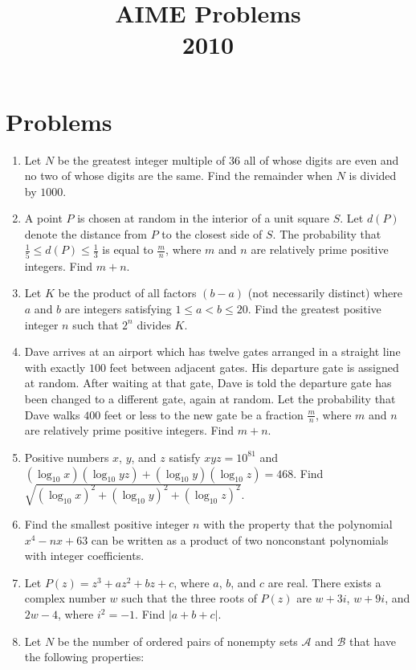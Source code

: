 \documentclass{article}
\title{AIME Problems \\ 2010}
\date{}
\begin{document}
\maketitle\thispagestyle{fancy}\newpage\section*{Problems}\begin{enumerate}[label=\arabic*., itemsep=0.5em]\item Let $N$ be the greatest integer multiple of $36$ all of whose digits are even and no two of whose digits are the same. Find the remainder when $N$ is divided by $1000$.\par \vspace{0.5em}\item A point $P$ is chosen at random in the interior of a unit square $S$. Let $d(P)$ denote the distance from $P$ to the closest side of $S$. The probability that $\frac{1}{5}\le d(P)\le\frac{1}{3}$ is equal to $\frac{m}{n}$, where $m$ and $n$ are relatively prime positive integers. Find $m+n$.\par \vspace{0.5em}\item Let $K$ be the product of all factors $(b-a)$ (not necessarily distinct) where $a$ and $b$ are integers satisfying $1\le a < b \le 20$. Find the greatest positive integer $n$ such that $2^n$ divides $K$.\par \vspace{0.5em}\item Dave arrives at an airport which has twelve gates arranged in a straight line with exactly $100$ feet between adjacent gates. His departure gate is assigned at random. After waiting at that gate, Dave is told the departure gate has been changed to a different gate, again at random. Let the probability that Dave walks $400$ feet or less to the new gate be a fraction $\frac{m}{n}$, where $m$ and $n$ are relatively prime positive integers. Find $m+n$.\par \vspace{0.5em}\item Positive numbers $x$, $y$, and $z$ satisfy $xyz = 10^{81}$ and $(\log_{10}x)(\log_{10} yz) + (\log_{10}y) (\log_{10}z) = 468$. Find $\sqrt {(\log_{10}x)^2 + (\log_{10}y)^2 + (\log_{10}z)^2}$.\par \vspace{0.5em}\item Find the smallest positive integer $n$ with the property that the polynomial $x^4 - nx + 63$ can be written as a product of two nonconstant polynomials with integer coefficients.\par \vspace{0.5em}\item Let $P(z)=z^3+az^2+bz+c$, where $a$, $b$, and $c$ are real. There exists a complex number $w$ such that the three roots of $P(z)$ are $w+3i$, $w+9i$, and $2w-4$, where $i^2=-1$. Find $|a+b+c|$.\par \vspace{0.5em}\item Let $N$ be the number of ordered pairs of nonempty sets $\mathcal{A}$ and $\mathcal{B}$ that have the following properties:


\end{enumerate}
\end{document}
